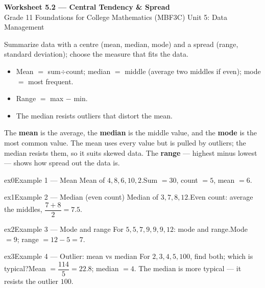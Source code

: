 \documentclass[11pt]{article}
\begin{document}
\begin{center}
{\LARGE\bfseries\color{titleblue}Worksheet 5.2 --- Central Tendency \& Spread}\\[2pt]
{\small Grade 11 Foundations for College Mathematics (MBF3C) \textperiodcentered{} Unit 5: Data Management}
\end{center}

\begin{ideabox}
Summarize data with a centre (mean, median, mode) and a spread (range, standard deviation); choose the measure that fits the data.
\begin{itemize}[leftmargin=*,itemsep=2pt]
  \item Mean $=$ sum$\div$count; median $=$ middle (average two middles if even); mode $=$ most frequent.
  \item Range $=$ max $-$ min.
  \item The median resists outliers that distort the mean.
\end{itemize}
\end{ideabox}

\begin{learnbox}
The \textbf{mean} is the average, the \textbf{median} is the middle value, and the \textbf{mode} is the most common value.
The mean uses every value but is pulled by outliers; the median resists them, so it suits skewed data.
The \textbf{range} — highest minus lowest — shows how spread out the data is.
\end{learnbox}


\begin{example}{ex0}{Example 1 --- Mean}
Mean of $4,8,6,10,2$.\soln Sum $=30$, count $=5$, mean $=6$.
\end{example}

\begin{example}{ex1}{Example 2 --- Median (even count)}
Median of $3,7,8,12$.\soln Even count: average the middles, $\dfrac{7+8}{2}=7.5$.
\end{example}

\begin{example}{ex2}{Example 3 --- Mode and range}
For $5,5,7,9,9,9,12$: mode and range.\soln Mode $=9$; range $=12-5=7$.
\end{example}

\begin{example}{ex3}{Example 4 --- Outlier: mean vs median}
For $2,3,4,5,100$, find both; which is typical?\soln Mean $=\dfrac{114}{5}=22.8$; median $=4$. The median is more typical — it resists the outlier $100$.
\end{example}
\end{document}
